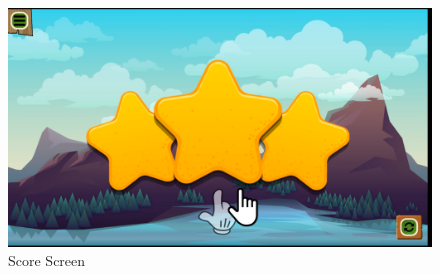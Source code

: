 \begin{figure}[H]
    \centering
    \includegraphics[width=1\textwidth]{figures/scorescreen}
    \caption{Score Screen}
    \label{fig:scorescreen}
\end{figure}
